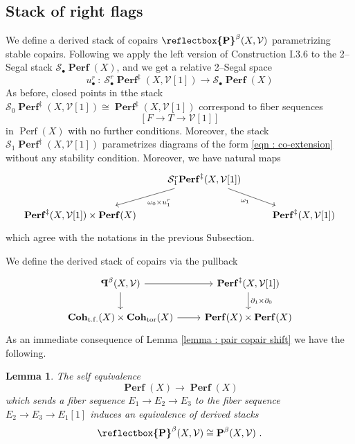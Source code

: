 \documentclass[11pt]{article}
\newtheorem{lemma}[theorem]{Lemma}
\newcommand{\segal}{\mathcal{S}}
\newcommand{\fbetastack}{\boldsymbol{\operatorname{Coh}}_{\operatorname{t.f.}}(X)}
\newcommand{\tbetastack}{\boldsymbol{\operatorname{Coh}}_{\operatorname{tor}}(X)}
\newcommand{\perf}{\operatorname{Perf}(X)}
\newcommand{\perfstack}{\boldsymbol{\operatorname{Perf}}(X)}
\newcommand{\framing}{\mathcal{V}}
\newcommand{\copairs}{\boldsymbol{\cop}^{\beta}(X,\mathcal{V})}
\newcommand{\pairs}{\boldsymbol{\operatorname{P}}^{\beta}(X,\mathcal{V})}
\newcommand{\coflags}{\boldsymbol{\operatorname{Perf}}^{\ddagger}(X,\mathcal{V}[1])}
\newcommand{\waldhausen}{\mathcal{S}_{\bullet}}
\newcommand{\cop}{\reflectbox{\ensuremath{\operatorname{P}}}}
\begin{document}
\subsection{Stack of right flags}\noindent We define a derived stack of copairs $\copairs$ parametrizing stable copairs. Following \cite{dps} we apply the left version of Construction I.3.6 to the 2--Segal stack $\waldhausen\perfstack$, and we get a relative 2--Segal space
\begin{equation}
    u^r_{\bullet}\ \colon \ \waldhausen^r\coflags \longrightarrow \waldhausen\perfstack
\end{equation}
As before, closed points in tthe stack $\segal_0\coflags \cong \coflags$ correspond to fiber sequences
\[
    [F \rightarrow T \rightarrow \framing[1]]
\]
in $\perf$ with no further conditions. Moreover, the stack $\segal_1\coflags$ parametrizes diagrams of the form \eqref{eqn : co-extension} without any stability condition. Moreover, we have natural maps
\[
    \begin{tikzcd}
	& {\segal_1^r\coflags} & \\
	{\coflags \times \perfstack} && \coflags
	\arrow["{\omega_0 \times u^r_1}", from=1-2, to=2-1]
	\arrow["{\omega_1}"', from=1-2, to=2-3]
\end{tikzcd}
\]
which agree with the notations in the previous Subsection. 

\bigskip

\noindent We define the derived stack of copairs via the pullback
\[\begin{tikzcd}
	\copairs & \coflags \\
	{\fbetastack \times \tbetastack} & {\perfstack \times \perfstack}
	\arrow[from=1-1, to=1-2]
	\arrow[from=1-1, to=2-1]
	\arrow["{\partial_1\times\partial_0}", from=1-2, to=2-2]
	\arrow[from=2-1, to=2-2]
\end{tikzcd}\]
As an immediate consequence of Lemma \ref{lemma : pair copair shift} we have the following.

\begin{lemma}\label{lemma : pair copair equivalence}
    The self equivalence
    \begin{equation}
        \perfstack \longrightarrow \perfstack
    \end{equation}
    which sends a fiber sequence $E_1 \rightarrow E_2 \rightarrow E_3$ to the fiber sequence $ E_2 \rightarrow E_3 \rightarrow E_1[1]$ induces an equivalence of derived stacks
    \begin{equation}
        \copairs \cong \pairs\ .
    \end{equation}
\end{lemma}
\end{document}
